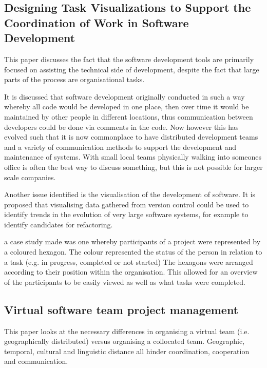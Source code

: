 \documentclass{l4proj}
\begin{document}
\subsection{Designing Task Visualizations to Support the Coordination of Work in Software Development}

This paper discusses the fact that the software development tools are primarily focused on assisting the technical side of development, despite the fact that large parts of the process are organisational tasks.

It is discussed that software development originally conducted in such a way whereby all code would be developed in one place, then over time it would be maintained by other people in different locations, thus communication between developers could be done via comments in the code.  Now however this has evolved such that it is now commonplace to have distributed development teams and a variety of communication methods to support the development and maintenance of systems.  With small local teams physically walking into someones office is often the best way to discuss something, but this is not possible for larger scale companies.

Another issue identified is the visualisation of the development of software.  It is proposed that visualising data gathered from version control could be used to identify trends in the evolution of very large software systems, for example to identify candidates for refactoring.  

a case study made was one whereby participants of a project were represented by a coloured hexagon.  The colour represented the status of the person in relation to a task (e.g. in progress, completed or not started)
The hexagons were arranged according to their position within the organisation.  This allowed for an overview of the participants to be easily viewed as well as what tasks were completed.



\subsection {Virtual software team project management}

This paper looks at the necessary differences in organising a virtual team (i.e. geographically distributed) versus organising a collocated team.  Geographic, temporal, cultural and linguistic distance all hinder coordination, cooperation and communication. 
\end{document}
